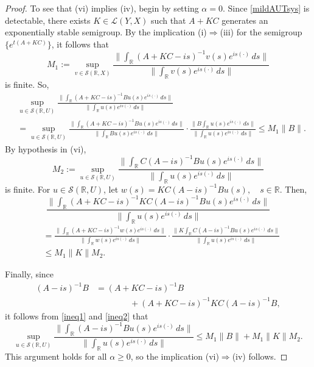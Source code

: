 \documentclass[10pt,psamsfonts,leqno]{siamltex}
\newcommand{\bbR}{\mathbb{R}}
\newcommand{\calS}{\mathcal{S}}
\newcommand{\lb}{\label}
\begin{document}
\begin{proof}
To see that (vi) implies (iv),  begin by setting
$\alpha = 0$.  Since \eqref{mildAUTsys} is detectable, there exists
$K\in
\mathcal{L}(Y,X)$ such that $A + KC$ generates an exponentially stable
semigroup. By the implication  (i)$\Rightarrow$(iii) for the semigroup
$\{e^{t(A+KC)}\}$, it follows that
\begin{equation*}
M_1 := \sup_{v\in \calS(\bbR, X)}
\frac{\| \int_\bbR (A+KC-is)^{-1}v(s)e^{is(\cdot)}\,ds\| }
{\| \int_\bbR v(s)e^{is(\cdot)}\,ds\| }
\end{equation*}
is finite.  So,
\begin{equation}\lb{ineq1}
\begin{align}
&\sup_{u\in \calS(\bbR, U)}
\frac{\|\int_\bbR (A+KC-is)^{-1}Bu(s)e^{is(\cdot)}\,ds\|}
{\|\int_\bbR u(s)e^{is(\cdot)}\,ds\|}\\
&=\sup_{u\in \calS(\bbR, U)}
\frac{\|\int_\bbR (A+KC-is)^{-1}Bu(s)e^{is(\cdot)}\,ds\|}{\|\int_\bbR
Bu(s)e^{is(\cdot)}\,ds\|}\cdot\frac{\| B\int_\bbR
u(s)e^{is(\cdot)}\,ds\|}{\|\int_\bbR u(s)e^{is(\cdot)}\,ds\|}
\le M_1 \| B \|.\nonumber
\end{align}
\end{equation}
By hypothesis in (vi),
\begin{equation*}
M_2:=\sup_{u\in \calS(\bbR, U)}
\frac{\|\int_\bbR C(A-is)^{-1}Bu(s)e^{is(\cdot)}\,ds\|}
{\|\int_\bbR u(s)e^{is(\cdot)}\,ds\|}
\end{equation*}
is finite.  For $u\in \calS(\bbR,U)$,
let $w(s)=KC(A-is)^{-1}Bu(s),\quad s\in \bbR$. Then,
\begin{equation}\lb{ineq2}
\frac{\|\int_\bbR (A+KC-is)^{-1}KC(A-is)^{-1}Bu(s)e^{is(\cdot)}\,ds\|}
{\|\int_\bbR u(s)e^{is(\cdot)}\,ds\|}
\end{equation}
\begin{align*}
&=\frac{\|\int_\bbR (A+KC-is)^{-1}w(s)e^{is(\cdot)}\,ds\|}
{\|\int_\bbR w(s)e^{is(\cdot)}\,ds\|}
 \cdot \frac{\| K\int_\bbR C(A-is)^{-1}Bu(s)e^{is(\cdot)}\,ds\|}
{\|\int_\bbR u(s)e^{is(\cdot)}\,ds\|}\\
&\le M_1 \|K \| M_2.
\end{align*}

Finally, since
\begin{equation*}\begin{aligned}
(A-is)^{-1}B & = (A+KC-is)^{-1}B \\
& \qquad\qquad+ (A+KC-is)^{-1}KC(A-is)^{-1}B,
\end{aligned}
\end{equation*}
it follows from \eqref{ineq1} and \eqref{ineq2} that
\begin{equation*}
\sup_{u\in \calS(\bbR, U)}
\frac{\|\int_\bbR (A-is)^{-1}Bu(s)e^{is(\cdot)}\,ds\|}
{\|\int_\bbR u(s)e^{is(\cdot)}\,ds\|}\le M_1\| B \| + M_1 \| K \| M_2 .
\end{equation*}
This argument holds for all $\alpha\ge0$, so the implication
(vi)$\Rightarrow$(iv) follows.


\end{proof}
\end{document}
